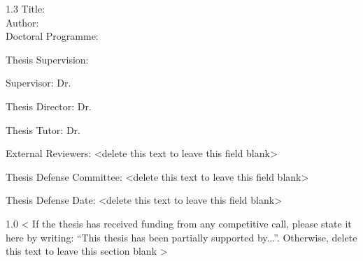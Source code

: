 
\begin{spacing}{1.3}
Title: \thesisTitle \\
Author: \thesisAuthor \\
Doctoral Programme:	 \DoctoralProgramme
\end{spacing}
Thesis Supervision: 
\begin{mydescription}
    \item Supervisor: Dr. \supervisorDetails 
    \item Thesis Director: Dr. \unisupervisorDetails 
    \item Thesis Tutor: Dr. \unitutorDetails 
\end{mydescription}

\vspace{10 mm}
External Reviewers: <delete this text to leave this field blank>

\vspace{30 mm}

Thesis Defense Committee: <delete this text to leave this field blank>


\vspace{50mm}



Thesis Defense Date: <delete this text to leave this field blank>



\vspace{\fill}
\begin{spacing}{1.0}
< If the thesis has received funding from any competitive call, please state it here by writing: “This thesis has been partially supported by...”. Otherwise, delete this text to leave this section blank >
\end{spacing}

